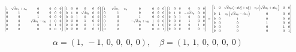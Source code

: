 \documentclass[11pt]{article}
\theoremstyle{definition}
\begin{document}
\[
\scaletoalign{\textwidth}{{\left[\begin{matrix}1 & \sqrt{d} u_{1} + u_{0} & 0 & 0 & 0 & 0\\0 & 1 & 0 & 0 & 0 & 0\\0 & 0 & 1 & 0 & 0 & 0\\0 & 0 & \sqrt{d} u_{1} - u_{0} & 1 & 0 & 0\\0 & 0 & 0 & 0 & 1 & 0\\0 & 0 & 0 & 0 & 0 & 1\end{matrix}\right]} {\left[\begin{matrix}1 & 0 & 0 & 0 & 0 & 0\\0 & 1 & 0 & \sqrt{d} v_{0} & 0 & 0\\0 & 0 & 1 & 0 & 0 & 0\\0 & 0 & 0 & 1 & 0 & 0\\0 & 0 & 0 & 0 & 1 & 0\\0 & 0 & 0 & 0 & 0 & 1\end{matrix}\right]} {\left[\begin{matrix}1 & - \sqrt{d} u_{1} - u_{0} & 0 & 0 & 0 & 0\\0 & 1 & 0 & 0 & 0 & 0\\0 & 0 & 1 & 0 & 0 & 0\\0 & 0 & - \sqrt{d} u_{1} + u_{0} & 1 & 0 & 0\\0 & 0 & 0 & 0 & 1 & 0\\0 & 0 & 0 & 0 & 0 & 1\end{matrix}\right]} {\left[\begin{matrix}1 & 0 & 0 & 0 & 0 & 0\\0 & 1 & 0 & - \sqrt{d} v_{0} & 0 & 0\\0 & 0 & 1 & 0 & 0 & 0\\0 & 0 & 0 & 1 & 0 & 0\\0 & 0 & 0 & 0 & 1 & 0\\0 & 0 & 0 & 0 & 0 & 1\end{matrix}\right]} = {\left[\begin{matrix}1 & 0 & \sqrt{d} v_{0} \left(- d u_{1}^{2} + u_{0}^{2}\right) & v_{0} \left(\sqrt{d} u_{0} + d u_{1}\right) & 0 & 0\\0 & 1 & v_{0} \left(\sqrt{d} u_{0} - d u_{1}\right) & 0 & 0 & 0\\0 & 0 & 1 & 0 & 0 & 0\\0 & 0 & 0 & 1 & 0 & 0\\0 & 0 & 0 & 0 & 1 & 0\\0 & 0 & 0 & 0 & 0 & 1\end{matrix}\right]}}
\]
\[
\alpha = \left( 1, \  -1, \  0, \  0, \  0, \  0\right), \quad \beta = \left( 1, \  1, \  0, \  0, \  0, \  0\right)
\]
\end{document}
